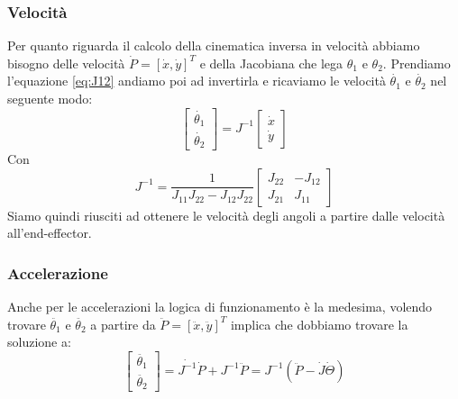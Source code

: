 \subsubsection{Velocità}
Per quanto riguarda il calcolo della cinematica inversa in velocità abbiamo bisogno delle velocità $\dot{P} = [\dot{x},\dot{y}]^T$ e della Jacobiana che lega $\theta_1$ e $\theta_2$. Prendiamo l'equazione \ref{eq:J12} andiamo poi ad invertirla e ricaviamo le velocità $\dot{\theta_1}$ e $\dot{\theta_2}$ nel seguente modo:
\begin{equation}
   \begin{bmatrix} \dot{\theta_1} \\ \dot{\theta_2}  \end{bmatrix} 
    = J^{-1} \begin{bmatrix} \dot{x} \\ \dot{y} \end{bmatrix}
\end{equation}
Con
\begin{equation}
	J^{-1} = \frac{1}{J_{11}J_{22}-J_{12}J_{22}
	}\begin{bmatrix}
		J_{22} & -J_{12} \\ J_{21} & J_{11}
\end{bmatrix}
\end{equation} 
Siamo quindi riusciti ad ottenere le velocità degli angoli a partire dalle velocità all'end-effector.
\subsubsection{Accelerazione}
Anche per le accelerazioni la logica di funzionamento è la medesima, volendo trovare $\ddot{\theta_1}$ e $\ddot{\theta_2}$ a partire da $\ddot{P} = [\ddot{x},\ddot{y}]^T$ implica che dobbiamo trovare la soluzione a:
\begin{equation}
	\begin{bmatrix}
		\ddot{\theta_1} \\ \ddot{\theta_2}
	\end{bmatrix} = 
	\dot{J^{-1}}\dot{P} + J^{-1}\ddot{P} = J^{-1}(\ddot{P}-\dot{J}\dot{\Theta})
\end{equation}
